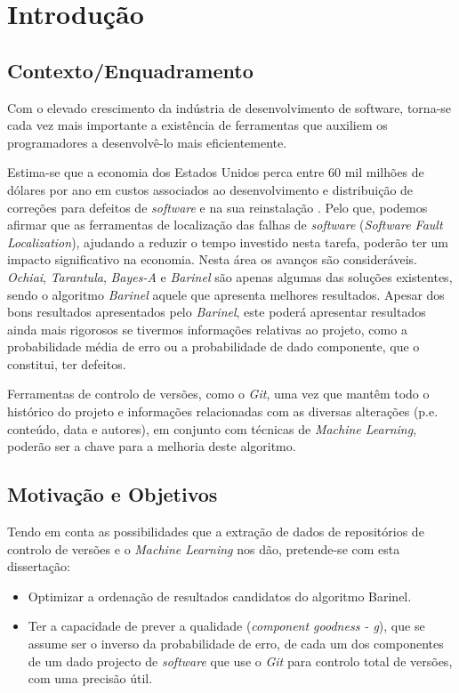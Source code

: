 \chapter{Introdução} \label{chap:intro}

\section*{}


\section{Contexto/Enquadramento} \label{sec:context}

Com o elevado crescimento da indústria de desenvolvimento de software,
torna-se cada vez mais importante a existência de ferramentas que auxiliem
os programadores a desenvolvê-lo mais eficientemente.

Estima-se que a economia dos Estados Unidos perca entre 60 mil milhões de dólares por ano em custos associados ao desenvolvimento e distribuição de correções para defeitos de \emph{software} e na sua reinstalação \cite{Zhivich2009}. Pelo que, podemos afirmar que as ferramentas de localização das falhas de \emph{software} (\emph{Software Fault Localization}), ajudando a reduzir o tempo investido nesta tarefa, poderão ter um impacto significativo na economia.
Nesta área os avanços são consideráveis. \emph{Ochiai}, \emph{Tarantula}, \emph{Bayes-A} e \emph{Barinel} são apenas algumas das soluções existentes, sendo o algoritmo \emph{Barinel} aquele que apresenta melhores resultados. \cite{Abreu2009}
Apesar dos bons resultados apresentados pelo \emph{Barinel}, este poderá apresentar resultados ainda mais rigorosos se tivermos informações relativas ao projeto, como a probabilidade média de erro ou a probabilidade de dado componente, que o constitui, ter defeitos.

Ferramentas de controlo de versões, como o \emph{Git}, uma vez que mantêm todo o histórico do projeto e informações relacionadas com as diversas alterações (p.e. conteúdo, data e autores), em conjunto com técnicas de \emph{Machine Learning}, poderão ser a chave para a melhoria deste algoritmo.

\section{Motivação e Objetivos} \label{sec:goals}

Tendo em conta as possibilidades que a extração de dados de repositórios de controlo de versões e o \emph{Machine Learning} nos dão, pretende-se com esta dissertação:
%
\begin{itemize}
\item Optimizar a ordenação de resultados candidatos do algoritmo Barinel.
\item Ter a capacidade de prever a qualidade (\emph{component goodness - g}), que se assume ser o inverso da probabilidade de erro, de cada um dos componentes de um dado projecto de \emph{software} que use o \emph{Git} para controlo total de versões, com uma precisão útil.
\end{itemize}

